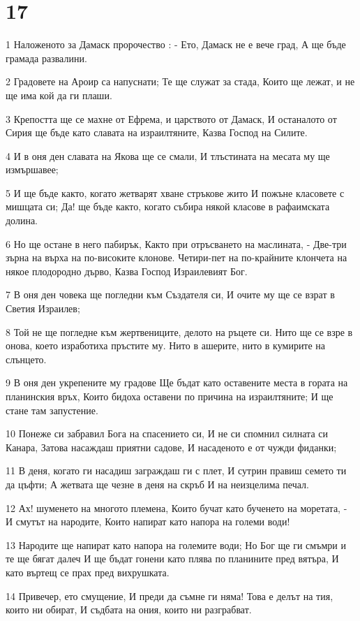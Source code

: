\chapter{17}

\par 1 Наложеното за Дамаск пророчество : - Ето, Дамаск не е вече град, А ще бъде грамада развалини.
\par 2 Градовете на Ароир са напуснати; Те ще служат за стада, Които ще лежат, и не ще има кой да ги плаши.
\par 3 Крепостта ще се махне от Ефрема, и царството от Дамаск, И останалото от Сирия ще бъде като славата на израилтяните, Казва Господ на Силите.
\par 4 И в оня ден славата на Якова ще се смали, И тлъстината на месата му ще измършавее;
\par 5 И ще бъде както, когато жетварят хване стръкове жито И пожъне класовете с мишцата си; Да! ще бъде както, когато събира някой класове в рафаимската долина.
\par 6 Но ще остане в него пабирък, Както при отръсването на маслината, - Две-три зърна на върха на по-високите клонове. Четири-пет на по-крайните клончета на някое плодородно дърво, Казва Господ Израилевият Бог.
\par 7 В оня ден човека ще погледни към Създателя си, И очите му ще се взрат в Светия Израилев;
\par 8 Той не ще погледне към жертвениците, делото на ръцете си. Нито ще се взре в онова, което изработиха пръстите му. Нито в ашерите, нито в кумирите на слънцето.
\par 9 В оня ден укрепените му градове Ще бъдат като оставените места в гората на планинския връх, Които бидоха оставени по причина на израилтяните; И ще стане там запустение.
\par 10 Понеже си забравил Бога на спасението си, И не си спомнил силната си Канара, Затова насаждаш приятни садове, И насаденото е от чужди фиданки;
\par 11 В деня, когато ги насадиш заграждаш ги с плет, И сутрин правиш семето ти да цъфти; А жетвата ще чезне в деня на скръб И на неизцелима печал.
\par 12 Ах! шуменето на многото племена, Които бучат като бученето на моретата, - И смутът на народите, Които напират като напора на големи води!
\par 13 Народите ще напират като напора на големите води; Но Бог ще ги смъмри и те ще бягат далеч И ще бъдат гонени като плява по планините пред вятъра, И като въртещ се прах пред вихрушката.
\par 14 Привечер, ето смущение, И преди да съмне ги няма! Това е делът на тия, които ни обират, И съдбата на ония, които ни разграбват.

